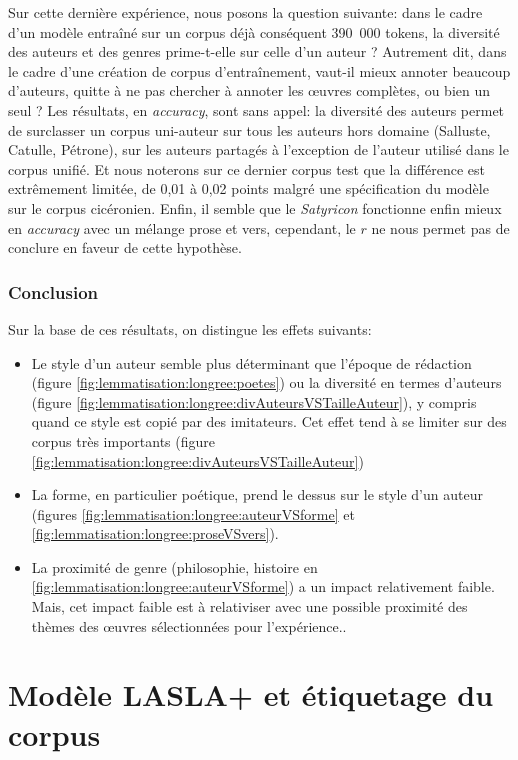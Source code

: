 Sur cette dernière expérience, nous posons la question suivante: dans le cadre d'un modèle entraîné sur un corpus déjà conséquent 390~000 tokens, la diversité des auteurs et des genres prime-t-elle sur celle d'un auteur ? Autrement dit, dans le cadre d'une création de corpus d'entraînement, vaut-il mieux annoter beaucoup d'auteurs, quitte à ne pas chercher à annoter les œuvres complètes, ou bien un seul ? Les résultats, en \textit{accuracy}, sont sans appel: la diversité des auteurs permet de surclasser un corpus uni-auteur sur tous les auteurs hors domaine (Salluste, Catulle, Pétrone), sur les auteurs partagés à l'exception de l'auteur utilisé dans le corpus unifié. Et nous noterons sur ce dernier corpus test que la différence est extrêmement limitée, de 0,01 à 0,02 points malgré une spécification du modèle sur le corpus cicéronien. Enfin, il semble que le \textit{Satyricon} fonctionne enfin mieux en \textit{accuracy} avec un mélange prose et vers, cependant, le $r$ ne nous permet pas de conclure en faveur de cette hypothèse.

\subsubsection{Conclusion}

Sur la base de ces résultats, on distingue les effets suivants:
\begin{itemize}
    \item Le style d'un auteur semble plus déterminant que l'époque de rédaction (figure \ref{fig:lemmatisation:longree:poetes}) ou la diversité en termes d'auteurs (figure \ref{fig:lemmatisation:longree:divAuteursVSTailleAuteur}), y compris quand ce style est copié par des imitateurs. Cet effet tend à se limiter sur des corpus très importants (figure \ref{fig:lemmatisation:longree:divAuteursVSTailleAuteur})
    \item La forme, en particulier poétique, prend le dessus sur le style d'un auteur (figures \ref{fig:lemmatisation:longree:auteurVSforme} et \ref{fig:lemmatisation:longree:proseVSvers}).
    \item La proximité de genre (philosophie, histoire en \ref{fig:lemmatisation:longree:auteurVSforme}) a un impact relativement faible. Mais, cet impact faible est à relativiser avec une possible proximité des thèmes des œuvres sélectionnées pour l'expérience..
\end{itemize}

\section{Modèle LASLA+ et étiquetage du corpus}

